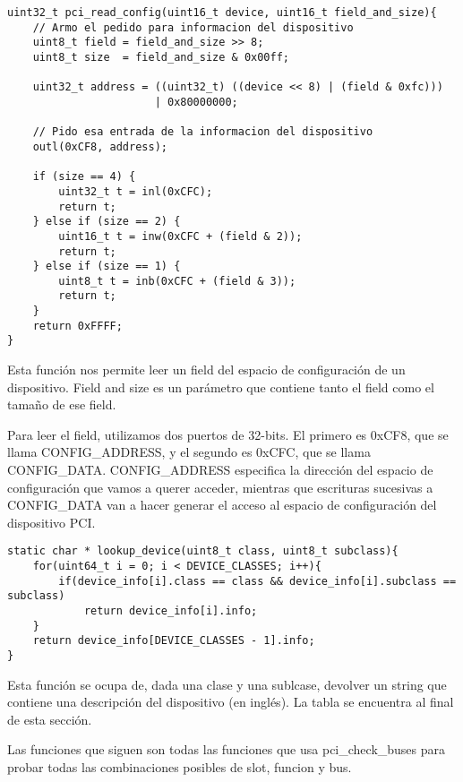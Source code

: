\begin{lstlisting}[style=customcmucho]
uint32_t pci_read_config(uint16_t device, uint16_t field_and_size){
    // Armo el pedido para informacion del dispositivo
    uint8_t field = field_and_size >> 8;
    uint8_t size  = field_and_size & 0x00ff;

    uint32_t address = ((uint32_t) ((device << 8) | (field & 0xfc))) 
                       | 0x80000000;
 
    // Pido esa entrada de la informacion del dispositivo
    outl(0xCF8, address);

   	if (size == 4) {
		uint32_t t = inl(0xCFC);
		return t;
	} else if (size == 2) {
		uint16_t t = inw(0xCFC + (field & 2));
		return t;
	} else if (size == 1) {
		uint8_t t = inb(0xCFC + (field & 3));
		return t;
	} 
    return 0xFFFF;
}
\end{lstlisting}

Esta función nos permite leer un field del espacio de configuración de un dispositivo. Field and size es un parámetro que contiene tanto el field como el tamaño de ese field.

Para leer el field, utilizamos dos puertos de 32-bits. El primero es 0xCF8, que se llama CONFIG\_ADDRESS, y el segundo es 0xCFC, que se llama CONFIG\_DATA. CONFIG\_ADDRESS especifica la dirección del espacio de configuración que vamos a querer acceder, mientras que escrituras sucesivas a CONFIG\_DATA van a hacer generar el acceso al espacio de configuración del dispositivo PCI.

\begin{lstlisting}[style=customcmucho]
static char * lookup_device(uint8_t class, uint8_t subclass){
    for(uint64_t i = 0; i < DEVICE_CLASSES; i++){
        if(device_info[i].class == class && device_info[i].subclass == subclass)
            return device_info[i].info;
    }
    return device_info[DEVICE_CLASSES - 1].info;
}
\end{lstlisting}

Esta función se ocupa de, dada una clase y una sublcase, devolver un string que contiene una descripción del dispositivo (en inglés). La tabla se encuentra al final de esta sección.


Las funciones que siguen son todas las funciones que usa pci\_check\_buses para probar todas las combinaciones posibles de slot, funcion y bus.


